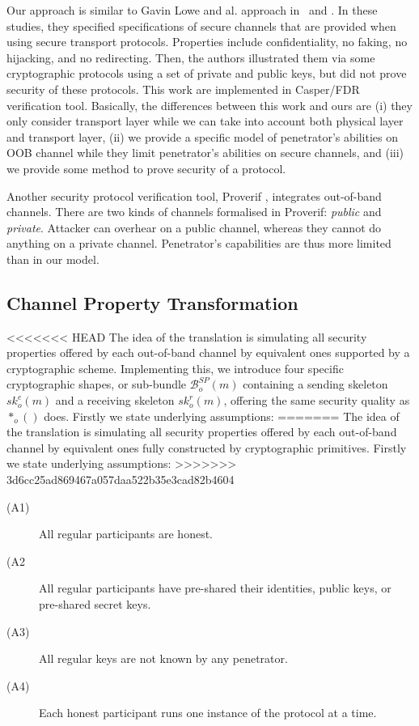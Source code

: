 Our approach is similar to Gavin Lowe and al. approach in~\cite{cdilloway2007spec} and \cite{Kamil:2011aa}. In these studies, they specified specifications of secure channels that are provided when using secure transport protocols. Properties include confidentiality, no faking, no hijacking, and no redirecting. Then, the authors illustrated them via some cryptographic protocols using a set of private and public keys, but did not prove security of these protocols. This work are implemented in Casper/FDR verification tool\cite{596779}. Basically, the differences between this work and ours are (i) they only consider transport layer while we can take into account both physical layer and transport layer, (ii) we provide a specific model of penetrator's abilities on OOB channel while they limit penetrator's abilities on secure channels, and (iii) we provide some method to prove security of a protocol.

Another security protocol verification tool, Proverif \cite{BlanchetCSFW01}, integrates out-of-band channels.
There are two kinds of channels formalised in Proverif: \emph{public} and \emph{private}. Attacker can overhear on a public channel, whereas they cannot do anything on a private channel. Penetrator's capabilities are thus more limited than in our model.

\subsection{Channel Property Transformation}\label{OOB-transform}
<<<<<<< HEAD
The idea of the translation is simulating all security properties offered by each out-of-band channel by equivalent ones supported by a cryptographic scheme. Implementing this, we introduce four specific cryptographic shapes, or sub-bundle $\mathcal{B}^{SP}_{o}(m)$ containing a sending skeleton $sk^e_o(m)$ and a receiving skeleton $sk^r_o(m)$, offering the same security quality as $*_o()$ does. Firstly we state underlying assumptions:
=======
The idea of the translation is simulating all security properties offered by each out-of-band channel by equivalent ones fully constructed by cryptographic primitives. Firstly we state underlying assumptions:
>>>>>>> 3d6cc25ad869467a057daa522b35e3cad82b4604

\begin{description}
\item [(A1)] All regular participants are honest. 
\item [(A2] All regular participants have pre-shared their identities, public keys, or pre-shared secret keys. 
\item [(A3)] All regular keys are not known by any penetrator. 
\item [(A4)] Each honest participant runs one instance of the protocol at a time. 
\end{description}

